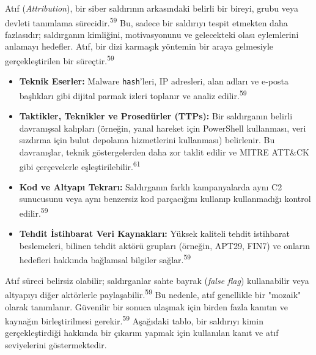 Atıf (\textit{Attribution}), bir siber saldırının arkasındaki belirli bir bireyi, grubu veya devleti tanımlama sürecidir.\textsuperscript{59} Bu, sadece bir saldırıyı tespit etmekten daha fazlasıdır; saldırganın kimliğini, motivasyonunu ve gelecekteki olası eylemlerini anlamayı hedefler. Atıf, bir dizi karmaşık yöntemin bir araya gelmesiyle gerçekleştirilen bir süreçtir.\textsuperscript{59}

\begin{itemize}
    \item \textbf{Teknik Eserler:} Malware \texttt{hash}'leri, IP adresleri, alan adları ve e-posta başlıkları gibi dijital parmak izleri toplanır ve analiz edilir.\textsuperscript{59}
    \item \textbf{Taktikler, Teknikler ve Prosedürler (TTPs):} Bir saldırganın belirli davranışsal kalıpları (örneğin, yanal hareket için PowerShell kullanması, veri sızdırma için bulut depolama hizmetlerini kullanması) belirlenir. Bu davranışlar, teknik göstergelerden daha zor taklit edilir ve MITRE ATT\&CK gibi çerçevelerle eşleştirilebilir.\textsuperscript{61}
    \item \textbf{Kod ve Altyapı Tekrarı:} Saldırganın farklı kampanyalarda aynı C2 sunucusunu veya aynı benzersiz kod parçacığını kullanıp kullanmadığı kontrol edilir.\textsuperscript{59}
    \item \textbf{Tehdit İstihbarat Veri Kaynakları:} Yüksek kaliteli tehdit istihbarat beslemeleri, bilinen tehdit aktörü grupları (örneğin, APT29, FIN7) ve onların hedefleri hakkında bağlamsal bilgiler sağlar.\textsuperscript{59}
\end{itemize}

Atıf süreci belirsiz olabilir; saldırganlar sahte bayrak (\textit{false flag}) kullanabilir veya altyapıyı diğer aktörlerle paylaşabilir.\textsuperscript{59} Bu nedenle, atıf genellikle bir "mozaik" olarak tanımlanır. Güvenilir bir sonuca ulaşmak için birden fazla kanıtın ve kaynağın birleştirilmesi gerekir.\textsuperscript{59}
Aşağıdaki tablo, bir saldırıyı kimin gerçekleştirdiği hakkında bir çıkarım yapmak için kullanılan kanıt ve atıf seviyelerini göstermektedir.

